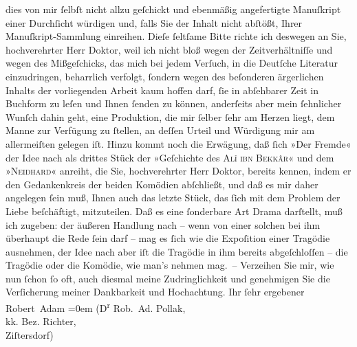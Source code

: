 \begin{ledgroupsized}[t]{13cm}
                    dies von mir ſelbſt nicht allzu geſchickt und ebenmäßig angefertigte Manuſkript
                    einer Durchſicht würdigen und, falls Sie der Inhalt nicht abſtößt, Ihrer
                    Manuſkript-Sammlung einreihen.\pend
           \pstart
           Dieſe ſeltſame Bitte richte ich deswe{\pb}gen an Sie,
                    hochverehrter Herr Doktor, weil ich nicht bloß wegen der Zeitverhältniſſe und
                    wegen des Mißgeſchicks, das mich bei jedem Verſuch, in die Deutſche Literatur
                    einzudringen, beharrlich verfolgt, ſondern wegen des beſonderen ärgerlichen
                    Inhalts der vorliegenden Arbeit kaum hoffen darf, ſie in abſehbarer Zeit in
                    Buchform zu leſen und Ihnen ſenden zu können, anderſeits aber mein ſehnlicher
                    Wunſch dahin geht, eine Produktion, die mir ſelber ſehr am Herzen liegt, dem
                    Manne zur Verfügung zu ſtellen, an deſſen Urteil und Würdigung mir am
                    allermeiſten gelegen iſt.\pend
           \pstart
           Hinzu kommt noch die Erwägung, daß ſich »Der
                        Fremde« der Idee nach als drittes Stück der »Geſchichte des \textsc{Alî ibn Bekkâr}« und dem »\textsc{Neidhard}« anreiht, die Sie, hochverehrter Herr Doktor, bereits kennen, indem er den
                    Gedankenkreis der beiden Komödien abſchließt, und daß es mir daher angelegen
                    ſein muß, Ihnen auch das letzte Stück, das ſich mit {\pb}dem Problem der Liebe beſchäftigt, mitzuteilen.
                    Daß es eine ſonderbare Art Drama darſtellt, muß ich zugeben: der äußeren
                    Handlung nach – wenn von einer solchen bei ihm überhaupt die Rede ſein darf –
                    mag es ſich wie die Expoſition einer Tragödie ausnehmen, der Idee nach aber iſt
                    die Tragödie in ihm bereits abgeſchloſſen – die Tragödie oder die Komödie, wie
                    man’s nehmen mag. –\pend
           \pstart
           Verzeihen Sie mir, wie nun ſchon ſo oft, auch diesmal meine Zudringlichkeit und
                    genehmigen Sie die Verſicherung meiner Dankbarkeit und Hochachtung.\pend
           \pstart
           Ihr ſehr ergebener{\\[\baselineskip]}\spacefill\mbox{Robert Adam}\pend
           \leftskip=0em{}\pstart
           \noindent{}\raggedleft{}(D\textsuperscript{r} Rob. Ad. Pollak,{\\}kk. Bez. Richter,{\\}Ziſtersdorf)\pend
           

\end{ledgroupsized}
